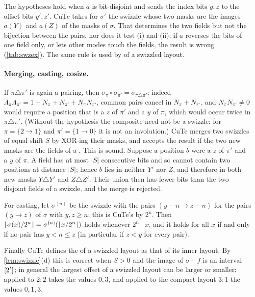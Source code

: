 \noindent The hypotheses hold when $a$ is bit-disjoint and sends the index bits $y,z$ to the
offset bits $y',z'$. CuTe takes for $\sigma'$ the swizzle whose two masks are the images $a(Y)$
and $a(Z)$ of the masks of $\sigma$. That determines the two fields but not the bijection between
the pairs, nor does it test (i) and (ii): if $a$ reverses the bits of one field only, or lets
other modes touch the fields, the result is wrong (\cref{tab:swzex}). The same rule is used by
 of a swizzled layout.

\paragraph{Merging, casting, cosize.}
If $\pi\triangle\pi'$ is again a pairing, then
$\sigma_\pi\circ\sigma_{\pi'}=\sigma_{\pi\triangle\pi'}$: indeed
$\Lambda_\pi\Lambda_{\pi'}=1+N_\pi+N_{\pi'}+N_\pi N_{\pi'}$, common pairs cancel in
$N_\pi+N_{\pi'}$, and $N_\pi N_{\pi'}\neq0$ would require a position that is a $z$ of $\pi'$ and a
$y$ of $\pi$, which would occur twice in $\pi\triangle\pi'$. (Without the hypothesis the composite
need not be a swizzle: for $\pi=\{2\to1\}$ and $\pi'=\{1\to0\}$ it is not an involution.) CuTe
merges two swizzles of equal shift $S$ by XOR-ing their masks, and accepts the result if the two
new masks are the fields of a . This is sound. Suppose a position $b$ were a $z$
of $\pi'$ and a $y$ of $\pi$. A field has at most $|S|$ consecutive bits and so cannot contain two
positions at distance $|S|$; hence $b$ lies in neither $Y'$ nor $Z$, and therefore in both new
masks $Y\triangle Y'$ and $Z\triangle Z'$. Their union then has fewer bits than the two disjoint
fields of a swizzle, and the merge is rejected.

For casting, let $\sigma^{(n)}$ be the swizzle with the pairs $(y-n\to z-n)$ for the pairs
$(y\to z)$ of $\sigma$ with $y,z\ge n$; this is CuTe's  by $2^n$. Then
$\left\lfloor \sigma(x)/2^n \right\rfloor=\sigma^{(n)}(\left\lfloor x/2^n \right\rfloor)$ holds whenever $2^n\mid x$, and it holds for
all $x$ if and only if no pair has $y<n\le z$ (in particular if $z<y$ for every pair).

Finally CuTe defines the  of a swizzled layout as that of its inner layout. By
\cref{lem:swizzle}(d) this is correct when $S>0$ and the image of $o+f$ is an interval
$[2^t]$; in general the largest offset of a swizzled layout can be larger or smaller:
 applied to $2:2$ takes the values $0,3$, and applied to the compact layout
$3:1$ the values $0,1,3$.

